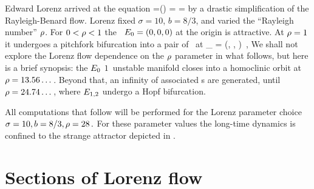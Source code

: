 Edward Lorenz arrived at the equation
\beq
\dot{\ssp}=\pVeloc(\ssp)
    =
    =
by a drastic simplification of
the Rayleigh-Benard flow. %
Lorenz fixed
$\sigma = 10$, $ b= 8/3$,
and varied the ``Rayleigh number'' $\rho$. For
$0 < \rho < 1$ the \eqv\ $E_{0} =(0,0,0)$
at the origin is attractive.
At $ \rho = 1$  it undergoes a pitchfork
bifurcation into a pair of \eqva\ at
\beq
\ssp_{} = (\pm {}, \pm {}, )
\,,
We shall not explore the Lorenz flow dependence on the $\rho$
parameter in what follows, but here is a brief synopsis: the
$E_{0}$  $1$\dmn\ unstable manifold closes into a
homoclinic orbit at $\rho=13.56\dots$. Beyond that, an infinity
of associated \po s are generated, until $\rho = 24.74\dots$,
where $E_{1,2}$ undergo a Hopf bifurcation.

All computations that follow
will be performed for the Lorenz parameter choice
\(
    \sigma = 10, b= 8/3, \rho = 28
\,.
\)
For these parameter values the long-time dynamics is confined to
the strange attractor
depicted in  .

\section{Sections of Lorenz flow}\label{exmp:LorenzSect}

